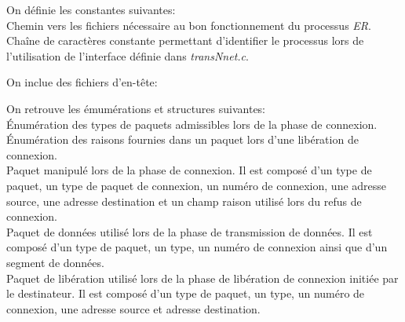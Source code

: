 \documentclass[11pt,french]{article}
\begin{document}
                On définie les constantes suivantes:\\
                
                Chemin vers les fichiers nécessaire au bon fonctionnement du processus \emph{ER}.\\

                
                Chaîne de caractères constante permettant d'identifier le processus lors de l'utilisation de l'interface définie dans \emph{transNnet.c}.\\

                \vspace{0.5cm}

                On inclue des fichiers d'en-tête:\\
                

                \vspace{0.5cm}

                On retrouve les émumérations et structures suivantes:\\
                
                Énumération des types de paquets admissibles lors de la phase de connexion.\\

                
                Énumération des raisons fournies dans un paquet lors d'une libération de connexion.\\

                
                Paquet manipulé lors de la phase de connexion. Il est composé d'un type de paquet, un type de paquet de connexion, un numéro de connexion, 
                une adresse source, une adresse destination et un champ raison utilisé lors du refus de connexion.\\

                
                Paquet de données utilisé lors de la phase de transmission de données. Il est composé d'un type de paquet, un type, un numéro de connexion 
                ainsi que d'un segment de données.\\

                
                Paquet de libération utilisé lors de la phase de libération de connexion initiée par le destinateur. Il est composé d'un type de paquet, 
                un type, un numéro de connexion, une adresse source et adresse destination.\\
\end{document}

